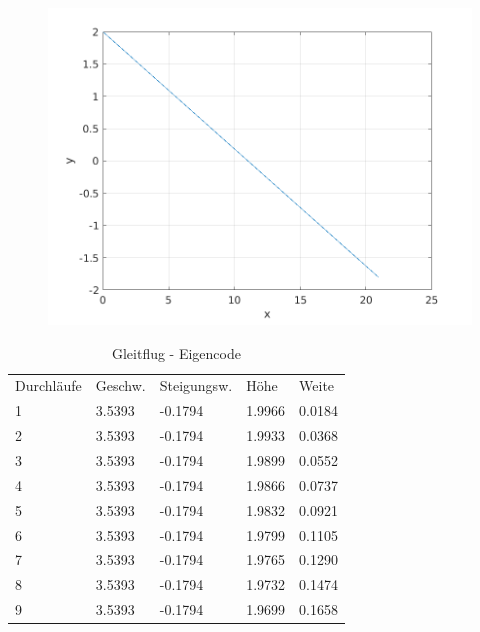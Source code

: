 \documentclass[a4paper,12pt]{scrartcl}
\begin{document}
\begin{figure}[htp]
	\centering
	\includegraphics{flightpath1.png}
	\label{fig:gleit}
\end{figure}
\begin{table}
\centering
\caption{Gleitflug - Eigencode}
\begin{tabular}{lllll}
Durchläufe & Geschw. & Steigungsw. & Höhe   & Weite   \\
1          & 3.5393  & -0.1794     & 1.9966 & 0.0184  \\
2          & 3.5393  & -0.1794     & 1.9933 & 0.0368  \\
3          & 3.5393  & -0.1794     & 1.9899 & 0.0552  \\
4          & 3.5393  & -0.1794     & 1.9866 & 0.0737  \\
5          & 3.5393  & -0.1794     & 1.9832 & 0.0921  \\
6          & 3.5393  & -0.1794     & 1.9799 & 0.1105  \\
7          & 3.5393  & -0.1794     & 1.9765 & 0.1290  \\
8          & 3.5393  & -0.1794     & 1.9732 & 0.1474  \\
9          & 3.5393  & -0.1794     & 1.9699 & 0.1658 
\end{tabular}
\end{table}
\end{document}
